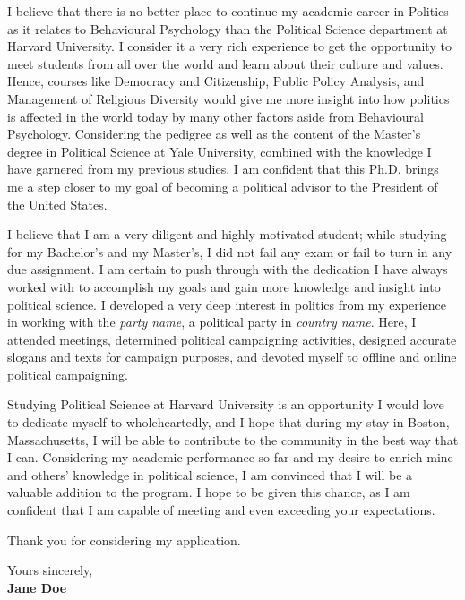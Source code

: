\documentclass[11pt]{report}
\begin{document}
\begin{titlepage}
\vspace{0.7em}

I believe that there is no better place to continue my academic career in Politics as it relates to Behavioural Psychology than the Political Science department at Harvard University. I consider it a very rich experience to get the opportunity to meet students from all over the world and learn about their culture and values. Hence, courses like Democracy and Citizenship, Public Policy Analysis, and Management of Religious Diversity would give me more insight into how politics is affected in the world today by many other factors aside from Behavioural Psychology. Considering the pedigree as well as the content of the Master's degree in Political Science at Yale University, combined with the knowledge I have garnered from my previous studies, I am confident that this Ph.D. brings me a step closer to my goal of becoming a political advisor to the President of the United States.

\vspace{0.7em}

I believe that I am a very diligent and highly motivated student; while studying for my Bachelor's and my Master's, I did not fail any exam or fail to turn in any due assignment. I am certain to push through with the dedication I have always worked with to accomplish my goals and gain more knowledge and insight into political science. I developed a very deep interest in politics from my experience in working with the \textit{party name}, a political party in \textit{country name}. Here, I attended meetings, determined political campaigning activities, designed accurate slogans and texts for campaign purposes, and devoted myself to offline and online political campaigning.

\vspace{0.7em}

Studying Political Science at Harvard University is an opportunity I would love to dedicate myself to wholeheartedly, and I hope that during my stay in Boston, Massachusetts, I will be able to contribute to the community in the best way that I can. Considering my academic performance so far and my desire to enrich mine and others' knowledge in political science, I am convinced that I will be a valuable addition to the program. I hope to be given this chance, as I am confident that I am capable of meeting and even exceeding your expectations.

\vspace{0.7em}

Thank you for considering my application.

\vspace{0.7em}

\raggedright Yours sincerely,\\
\textbf{Jane Doe}

\end{titlepage}
\end{document}
